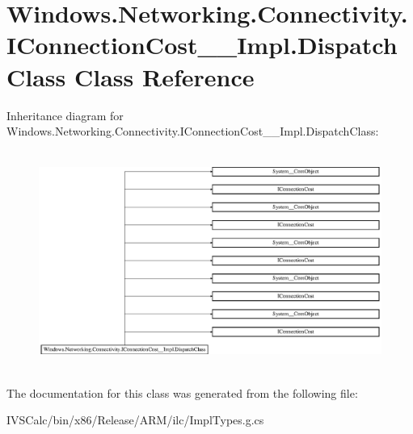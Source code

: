 \hypertarget{class_windows_1_1_networking_1_1_connectivity_1_1_i_connection_cost_____impl_1_1_dispatch_class}{}\section{Windows.\+Networking.\+Connectivity.\+I\+Connection\+Cost\+\_\+\+\_\+\+Impl.\+Dispatch\+Class Class Reference}
\label{class_windows_1_1_networking_1_1_connectivity_1_1_i_connection_cost_____impl_1_1_dispatch_class}
Inheritance diagram for Windows.\+Networking.\+Connectivity.\+I\+Connection\+Cost\+\_\+\+\_\+\+Impl.\+Dispatch\+Class\+:\begin{figure}[H]
\begin{center}
\leavevmode
\includegraphics[height=7.213115cm]{class_windows_1_1_networking_1_1_connectivity_1_1_i_connection_cost_____impl_1_1_dispatch_class}
\end{center}
\end{figure}


The documentation for this class was generated from the following file\+:\begin{DoxyCompactItemize}
\item 
I\+V\+S\+Calc/bin/x86/\+Release/\+A\+R\+M/ilc/Impl\+Types.\+g.\+cs\end{DoxyCompactItemize}

